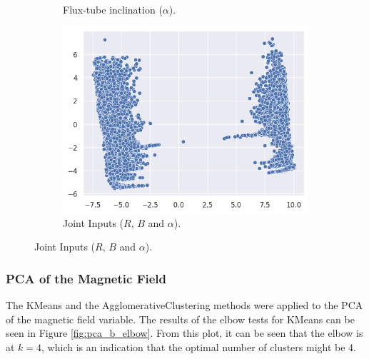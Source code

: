 \begin{figure}[h]
\begin{subfigure}[h]{0.329\textwidth}
        \caption{Flux-tube inclination ($\alpha$).}
        \label{fig:pca_alpha_2d}
    \end{subfigure}
    \begin{subfigure}[h]{0.329\textwidth}
        \centering
        \includegraphics[width=\textwidth]{figures/pca_joint_2d.png}
        \caption{Joint Inputs ($R$, $B$ and $\alpha$).}
        \label{fig:pca_joint_2d}
    \end{subfigure}
\end{figure}


\subsubsection{PCA of the Magnetic Field}\label{sec:pca_b}

The KMeans and the AgglomerativeClustering methods were applied to the PCA of the magnetic field variable. The results of the elbow tests for KMeans can be seen in Figure \ref{fig:pca_b_elbow}. From this plot, it can be seen that the elbow is at $k=4$, which is an indication that the optimal number of clusters might be 4. 

